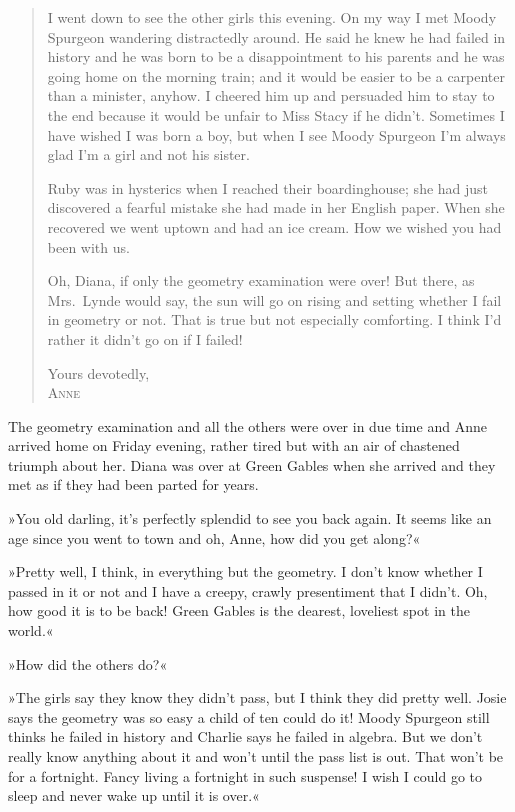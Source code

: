 \begin{quotation}
I went down to see the other girls this evening. On my way I met Moody Spurgeon wandering distractedly around. He said he knew he had failed in history and he was born to be a disappointment to his parents and he was going home on the morning train; and it would be easier to be a carpenter than a minister, anyhow. I cheered him up and persuaded him to stay to the end because it would be unfair to Miss Stacy if he didn't. Sometimes I have wished I was born a boy, but when I see Moody Spurgeon I'm always glad I'm a girl and not his sister.

Ruby was in hysterics when I reached their boardinghouse; she had just discovered a fearful mistake she had made in her English paper. When she recovered we went uptown and had an ice cream. How we wished you had been with us.

Oh, Diana, if only the geometry examination were over! But there, as Mrs.~Lynde would say, the sun will go on rising and setting whether I fail in geometry or not. That is true but not especially comforting. I think I'd rather it didn't go on if I failed!
\begin{flushright}
Yours devotedly,\\
\textsc{Anne}
\end{flushright}
\end{quotation}

The geometry examination and all the others were over in due time and Anne arrived home on Friday evening, rather tired but with an air of chastened triumph about her. Diana was over at Green Gables when she arrived and they met as if they had been parted for years.

»You old darling, it's perfectly splendid to see you back again. It seems like an age since you went to town and oh, Anne, how did you get along?«

»Pretty well, I think, in everything but the geometry. I don't know whether I passed in it or not and I have a creepy, crawly presentiment that I didn't. Oh, how good it is to be back! Green Gables is the dearest, loveliest spot in the world.«

»How did the others do?«

»The girls say they know they didn't pass, but I think they did pretty well. Josie says the geometry was so easy a child of ten could do it! Moody Spurgeon still thinks he failed in history and Charlie says he failed in algebra. But we don't really know anything about it and won't until the pass list is out. That won't be for a fortnight. Fancy living a fortnight in such suspense! I wish I could go to sleep and never wake up until it is over.«

